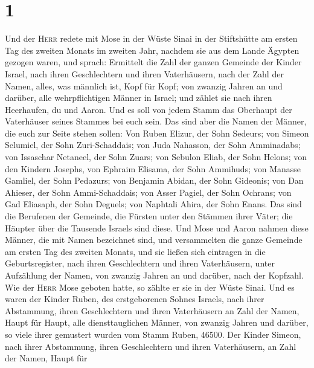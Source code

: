 \hypertarget{section}{%
\section{1}\label{section}}

 Und der \textsc{Herr} redete mit Mose in der Wüste Sinai
in der Stiftshütte am ersten Tag des zweiten Monats im zweiten Jahr,
nachdem sie aus dem Lande Ägypten gezogen waren, und sprach:
 Ermittelt die Zahl der ganzen Gemeinde der Kinder Israel,
nach ihren Geschlechtern und ihren Vaterhäusern, nach der Zahl der
Namen, alles, was männlich ist, Kopf für Kopf;  von
zwanzig Jahren an und darüber, alle wehrpflichtigen Männer in Israel;
und zählet sie nach ihren Heerhaufen, du und Aaron.  Und
es soll von jedem Stamm das Oberhaupt der Vaterhäuser seines Stammes bei
euch sein.  Das sind aber die Namen der Männer, die euch
zur Seite stehen sollen: Von Ruben Elizur, der Sohn Sedeurs;
 von Simeon Selumiel, der Sohn Zuri-Schaddais;
 von Juda Nahasson, der Sohn Amminadabs; 
von Issaschar Netaneel, der Sohn Zuars;  von Sebulon
Eliab, der Sohn Helons;  von den Kindern Josephs, von
Ephraim Elisama, der Sohn Ammihuds; von Manasse Gamliel, der Sohn
Pedazurs;  von Benjamin Abidan, der Sohn Gideonis;
 von Dan Ahieser, der Sohn Ammi-Schaddais;
 von Asser Pagiel, der Sohn Ochrans;  von
Gad Eliasaph, der Sohn Deguels;  von Naphtali Ahira, der
Sohn Enans.  Das sind die Berufenen der Gemeinde, die
Fürsten unter den Stämmen ihrer Väter; die Häupter über die Tausende
Israels sind diese.  Und Mose und Aaron nahmen diese
Männer, die mit Namen bezeichnet sind,  und versammelten
die ganze Gemeinde am ersten Tag des zweiten Monats, und sie ließen sich
eintragen in die Geburtsregister, nach ihren Geschlechtern und ihren
Vaterhäusern, unter Aufzählung der Namen, von zwanzig Jahren an und
darüber, nach der Kopfzahl.  Wie der \textsc{Herr} Mose
geboten hatte, so zählte er sie in der Wüste Sinai.  Und
es waren der Kinder Ruben, des erstgeborenen Sohnes Israels, nach ihrer
Abstammung, ihren Geschlechtern und ihren Vaterhäusern an Zahl der
Namen, Haupt für Haupt, alle diensttauglichen Männer, von zwanzig Jahren
und darüber,  so viele ihrer gemustert wurden vom Stamm
Ruben, 46500.  Der Kinder Simeon, nach ihrer Abstammung,
ihren Geschlechtern und ihren Vaterhäusern, an Zahl der Namen, Haupt für
